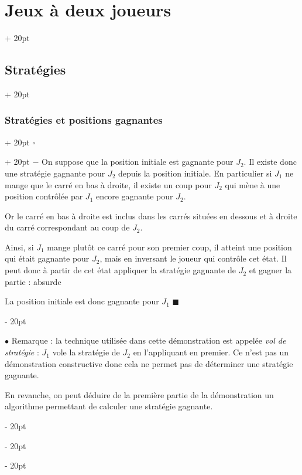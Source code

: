 \documentclass[a4paper, 12pt, twoside]{article}
\newcommand{\ind}[1][20pt]{\advance\leftskip + #1}
\newcommand{\deind}[1][20pt]{\advance\leftskip - #1}
\newenvironment{indt}[2][20pt]{#2 \par \ind[#1]}{\par \deind} %
\newenvironment{proof}[1][{}]{\begin{indt}{$\square$ #1}}{$\blacksquare$ \end{indt}}
\begin{document}
\begin{indt}{\section{Jeux à deux joueurs}}
\begin{indt}{\subsection{Stratégies}}
\begin{indt}{\subsubsection{Stratégies et positions gagnantes}}
\begin{proof}
                    $-$ On suppose que la position initiale est gagnante pour $J_2$.
                    Il existe donc une stratégie gagnante pour $J_2$ depuis la position initiale.
                    En particulier si $J_1$ ne mange que le carré en bas à droite, il existe un coup pour $J_2$ qui mène à une position contrôlée par $J_1$ encore gagnante pour $J_2$.

                    \begin{center}
                    \end{center}

                    Or le carré en bas à droite est inclus dans les carrés situées en dessous et à droite du carré correspondant au coup de $J_2$.

                    Ainsi, si $J_1$ mange plutôt ce carré pour son premier coup, il atteint une position qui était gagnante pour $J_2$, mais en inversant le joueur qui contrôle cet état. Il peut donc à partir de cet état appliquer la stratégie gagnante de $J_2$ et gagner la partie : absurde

                    La position initiale est donc gagnante pour $J_1$
                \end{proof}

                \vspace{12pt}
                
                $\bullet$ Remarque : la technique utilisée dans cette démonstration est appelée \emph{vol de stratégie} : $J_1$ vole la stratégie de $J_2$ en l'appliquant en premier. Ce n'est pas un démonstration constructive donc cela ne permet pas de déterminer une stratégie gagnante.

                En revanche, on peut déduire de la première partie de la démonstration un algorithme permettant de calculer une stratégie gagnante.
            \end{indt}


\end{indt}
\end{indt}
\end{document}

